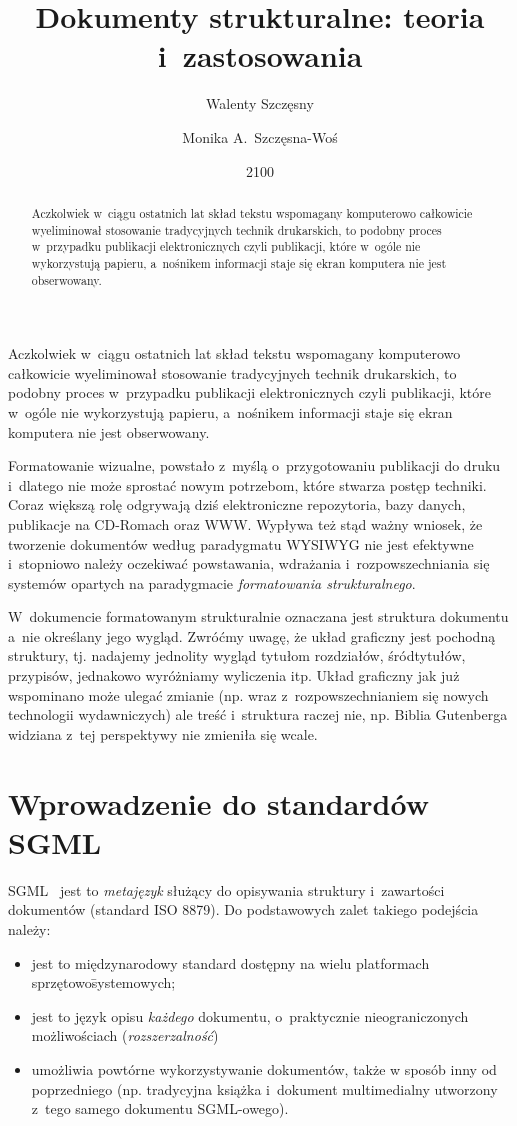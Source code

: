 \documentclass[brudnopis]{xmgr}
\author   {Walenty Szczęsny}
\author   {Monika A.~Szczęsna-Woś}
\title    {Dokumenty strukturalne: teoria i~zastosowania}
\date     {2100}
\begin{document}
\begin{abstract}
  Aczkolwiek w~ciągu ostatnich lat skład tekstu wspomagany komputerowo
  całkowicie wyeliminował stosowanie tradycyjnych technik drukarskich,
  to podobny proces w~przypadku publikacji elektronicznych czyli
  publikacji, które w~ogóle nie wykorzystują papieru, a~nośnikem
  informacji staje się ekran komputera nie jest obserwowany.
\end{abstract}

\maketitle
%
\introduction

Aczkolwiek w~ciągu ostatnich lat skład tekstu wspomagany
komputerowo całkowicie wyeliminował stosowanie tradycyjnych technik
drukarskich, to podobny proces w~przypadku publikacji elektronicznych
czyli publikacji, które w~ogóle nie wykorzystują papieru, a~nośnikem
informacji staje się ekran komputera nie jest obserwowany.

Formatowanie wizualne, powstało z~myślą o~przygotowaniu publikacji do
druku i~dlatego nie może sprostać nowym potrzebom, które stwarza
postęp techniki. Coraz większą rolę odgrywają dziś elektroniczne
repozytoria, bazy danych, publikacje na CD-Romach oraz WWW.  Wypływa
też stąd ważny wniosek, że tworzenie dokumentów według paradygmatu
WYSIWYG nie jest efektywne i~stopniowo należy oczekiwać powstawania,
wdrażania i~rozpowszechniania się systemów opartych na paradygmacie
\emph{formatowania strukturalnego}.

W~dokumencie formatowanym strukturalnie oznaczana jest struktura
dokumentu a~nie określany jego wygląd. Zwróćmy uwagę, że układ
graficzny jest pochodną struktury, tj. nadajemy jednolity wygląd
tytułom rozdziałów, śródtytułów, przypisów, jednakowo wyróżniamy
wyliczenia itp.  Układ graficzny jak już wspominano może ulegać zmianie
(np. wraz z~rozpowszechnianiem się nowych technologii wydawniczych)
ale treść i~struktura raczej nie, np. Biblia Gutenberga widziana z~tej
perspektywy nie zmieniła się wcale.

\chapter{Wprowadzenie do standardów SGML}

SGML~\cite{Goldfarb:2002:CFG} jest to \emph{metajęzyk} służący do opisywania
struktury i~zawartości dokumentów (standard ISO 8879).  Do
podstawowych zalet takiego podejścia należy: 
\begin{itemize}
\item
jest to międzynarodowy
standard dostępny na wielu platformach sprzętowo\=systemowych;
\item
jest to
język opisu \emph{każdego\/} dokumentu, o~praktycznie nieograniczonych
możliwościach (\emph{rozszerzalność\/}) 
\item
umożliwia powtórne
wykorzystywanie dokumentów, także w sposób inny od poprzedniego
(np. tradycyjna książka i~dokument multimedialny utworzony z~tego
samego dokumentu SGML-owego).
\end{itemize}
\end{document}
